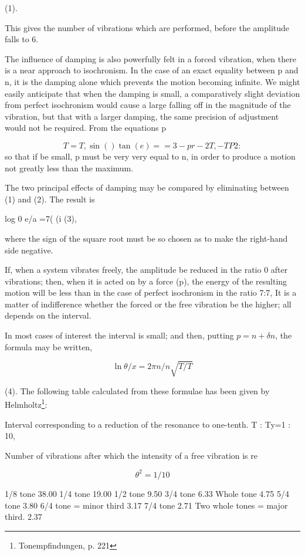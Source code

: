(1).

This gives the number of vibrations which are performed, before the amplitude
falls to 6.

The influence of damping is also powerfully felt in a forced vibration, when
there is a near approach to isochronism. In the case of an exact equality
between p and n, it is the damping alone which prevents the motion becoming
infinite. We might easily anticipate that when the damping is small, a
comparatively slight deviation from perfect isochronism would cause a large
falling off in the magnitude of the vibration, but that with a larger damping,
the same precision of adjustment would not be required. From the equations p

\[T =T, \sin() \tan(e)= = 3 -p r-2 T,-T P 2:\]
so that if be small, p must be
very very equal to n, in order to produce a motion not greatly less than the
maximum.

The two principal effects of damping may be compared by eliminating between (1)
and (2). The result is

log 0 e/a =7( (i (3),

where the sign of the square root must be so chosen as to make the right-hand
side negative.

If, when a system vibrates freely, the amplitude be reduced in the ratio 0
after vibrations; then, when it is acted on by a force (p), the energy of the
resulting motion will be less than in the case of perfect isochronism in the
ratio 7:7, It is a matter of indifference whether the forced or the free
vibration be the higher; all depends on the interval.

In most cases of interest the interval is small; and then, putting \(p=n +
\delta n\), the formula may be written,

\[\ln \theta / x = 2 \pi n/n  \sqrt{ T / T}\]

(4). The following table calculated from these formulae has been given by
Helmholtz\footnote{Tonempfindungen, p. 221}:

Interval corresponding to a reduction of the resonance to one-tenth. T : Ty=1 :
10,

Number of vibrations after which the intensity of a free vibration is re

\[\theta^2 = 1/10\]

1/8 tone 38.00 1/4 tone 19.00 1/2 tone 9.50 3/4 tone 6.33 Whole tone 4.75 5/4
tone 3.80 6/4 tone = minor third 3.17 7/4 tone 2.71 Two whole tones = major
third. 2.37

